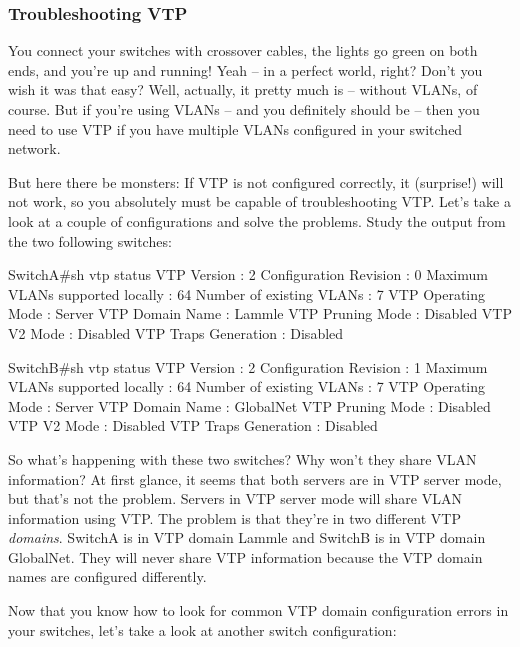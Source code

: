 \subsubsection[Troubleshooting
VTP]{\texorpdfstring{\protect\hypertarget{c15.xhtmlux5cux23c15-sec-8}{}{}Troubleshooting
VTP}{Troubleshooting VTP}}

You connect your switches with crossover cables, the lights go green on
both ends, and you're up and running! Yeah -- in a perfect world, right?
Don't you wish it was that easy? Well, actually, it pretty much
is -- without VLANs, of course. But if you're using VLANs -- and you
definitely should be -- then you need to use VTP if you have multiple
VLANs configured in your switched network.

But here there be monsters: If VTP is not configured correctly, it
(surprise!) will not work, so you absolutely must be capable of
troubleshooting VTP. Let's take a look at a couple of configurations and
solve the problems. Study the output from the two following switches:

\begin{cli}
SwitchA#sh vtp status
VTP Version                     : 2
Configuration Revision          : 0
Maximum VLANs supported locally : 64
Number of existing VLANs        : 7
VTP Operating Mode              : Server
VTP Domain Name                 : Lammle
VTP Pruning Mode                : Disabled
VTP V2 Mode                     : Disabled
VTP Traps Generation            : Disabled
 
SwitchB#sh vtp status
VTP Version                     : 2
Configuration Revision          : 1
Maximum VLANs supported locally : 64
Number of existing VLANs        : 7
VTP Operating Mode              : Server
VTP Domain Name                 : GlobalNet
VTP Pruning Mode                : Disabled
VTP V2 Mode                     : Disabled
VTP Traps Generation            : Disabled
\end{cli}

So what's happening with these two switches? Why won't they share VLAN
information? At first glance, it seems that both servers are in VTP
server mode, but that's not the problem. Servers in VTP server mode will
share VLAN information using VTP. The problem is that they're in two
different VTP \emph{domains}. SwitchA is in VTP domain Lammle and SwitchB
is in VTP domain GlobalNet. They will never share VTP information
because the VTP domain names are configured differently.

Now that you know how to look for common VTP domain configuration errors
in your switches, let's take a look at another switch configuration:

